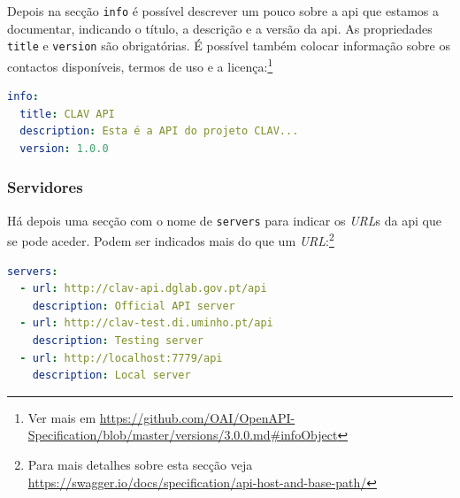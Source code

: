 Depois na secção \texttt{info} é possível descrever um pouco sobre a \acrshort{api} que estamos a documentar, indicando o título, a descrição e a versão da \acrshort{api}. As propriedades \texttt{title} e \texttt{version} são obrigatórias. É possível também colocar informação sobre os contactos disponíveis, termos de uso e a licença:\footnote{Ver mais em \url{https://github.com/OAI/OpenAPI-Specification/blob/master/versions/3.0.0.md\#infoObject}}
\begin{lstlisting}[language=yaml, caption={Exemplo de secção \texttt{info} indicando título, descrição e versão da \acrshort{api} na especificação \textit{OpenAPI}}]
info:
  title: CLAV API
  description: Esta é a API do projeto CLAV...
  version: 1.0.0
\end{lstlisting}

\vspace{-0.7cm}

\subsubsection{Servidores}
Há depois uma secção com o nome de \texttt{servers} para indicar os \textit{URL}s da \acrshort{api} que se pode aceder. Podem ser indicados mais do que um \textit{URL}:\footnote{Para mais detalhes sobre esta secção veja \url{https://swagger.io/docs/specification/api-host-and-base-path/}}
\begin{lstlisting}[language=yaml, caption=Exemplo de secção \texttt{servers} indicando os \textit{URL}s e a descrição de cada na especificação \textit{OpenAPI}]
servers:
  - url: http://clav-api.dglab.gov.pt/api
    description: Official API server
  - url: http://clav-test.di.uminho.pt/api
    description: Testing server
  - url: http://localhost:7779/api
    description: Local server
\end{lstlisting}

\vspace{-0.7cm}

